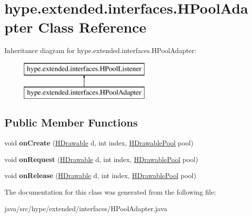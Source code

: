 \hypertarget{classhype_1_1extended_1_1interfaces_1_1_h_pool_adapter}{\section{hype.\-extended.\-interfaces.\-H\-Pool\-Adapter Class Reference}
\label{classhype_1_1extended_1_1interfaces_1_1_h_pool_adapter}
}
Inheritance diagram for hype.\-extended.\-interfaces.\-H\-Pool\-Adapter\-:\begin{figure}[H]
\begin{center}
\leavevmode
\includegraphics[height=2.000000cm]{classhype_1_1extended_1_1interfaces_1_1_h_pool_adapter}
\end{center}
\end{figure}
\subsection*{Public Member Functions}
\begin{DoxyCompactItemize}
\item 
\hypertarget{classhype_1_1extended_1_1interfaces_1_1_h_pool_adapter_a7583b5be639b28cb84cff9e52f81014a}{void {\bfseries on\-Create} (\hyperlink{classhype_1_1core_1_1drawable_1_1_h_drawable}{H\-Drawable} d, int index, \hyperlink{classhype_1_1extended_1_1util_1_1_h_drawable_pool}{H\-Drawable\-Pool} pool)}\label{classhype_1_1extended_1_1interfaces_1_1_h_pool_adapter_a7583b5be639b28cb84cff9e52f81014a}

\item 
\hypertarget{classhype_1_1extended_1_1interfaces_1_1_h_pool_adapter_ac1824ead6b7767ff7e56af1205e23ee3}{void {\bfseries on\-Request} (\hyperlink{classhype_1_1core_1_1drawable_1_1_h_drawable}{H\-Drawable} d, int index, \hyperlink{classhype_1_1extended_1_1util_1_1_h_drawable_pool}{H\-Drawable\-Pool} pool)}\label{classhype_1_1extended_1_1interfaces_1_1_h_pool_adapter_ac1824ead6b7767ff7e56af1205e23ee3}

\item 
\hypertarget{classhype_1_1extended_1_1interfaces_1_1_h_pool_adapter_a2b9629f1c576a1d0c085ca9e17f4c305}{void {\bfseries on\-Release} (\hyperlink{classhype_1_1core_1_1drawable_1_1_h_drawable}{H\-Drawable} d, int index, \hyperlink{classhype_1_1extended_1_1util_1_1_h_drawable_pool}{H\-Drawable\-Pool} pool)}\label{classhype_1_1extended_1_1interfaces_1_1_h_pool_adapter_a2b9629f1c576a1d0c085ca9e17f4c305}

\end{DoxyCompactItemize}


The documentation for this class was generated from the following file\-:\begin{DoxyCompactItemize}
\item 
java/src/hype/extended/interfaces/H\-Pool\-Adapter.\-java\end{DoxyCompactItemize}
